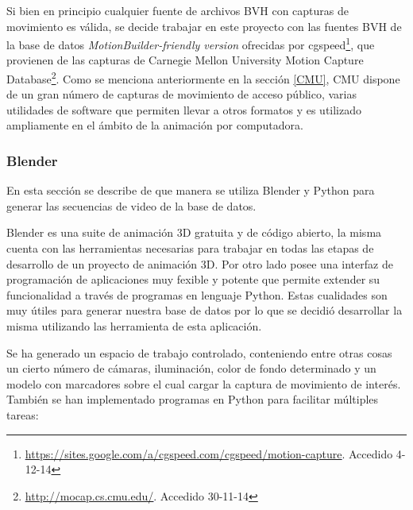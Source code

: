 Si bien en principio cualquier fuente de archivos BVH con capturas de movimiento es válida, se decide trabajar en este proyecto con las fuentes BVH de la base de datos \textit{MotionBuilder-friendly version} ofrecidas por cgspeed\footnote{\textcolor{blue}{\underline{\url{https://sites.google.com/a/cgspeed.com/cgspeed/motion-capture}}}. Accedido 4-12-14},
 que provienen de las capturas de Carnegie Mellon University Motion Capture Database\footnote{\textcolor{blue}{\underline{\url{http://mocap.cs.cmu.edu/}}}. Accedido 30-11-14}. 
 Como se menciona anteriormente en la sección \ref{CMU}, CMU dispone de un gran número de capturas de movimiento de acceso público, varias utilidades de software que permiten llevar a otros formatos y es utilizado ampliamente en el ámbito de la animación por computadora.




\subsubsection{Blender} %
En esta sección se describe de que manera se utiliza Blender y Python para generar las secuencias de video de la base de datos.





Blender es una suite de animación 3D gratuita y de código abierto, la misma cuenta con las herramientas necesarias para trabajar en todas las etapas de desarrollo de un proyecto de animación 3D. Por otro lado posee una interfaz de programación de aplicaciones muy fexible y potente que permite extender su funcionalidad a través de programas en lenguaje Python. Estas cualidades son muy útiles para generar nuestra base de datos por lo que se decidió desarrollar la misma utilizando las herramienta de esta aplicación.

Se ha generado un espacio de trabajo controlado, conteniendo entre otras cosas un cierto número de cámaras, iluminación, color de fondo determinado y un modelo con marcadores sobre el cual cargar la captura de movimiento de interés. También se han implementado programas en Python para facilitar múltiples tareas:

